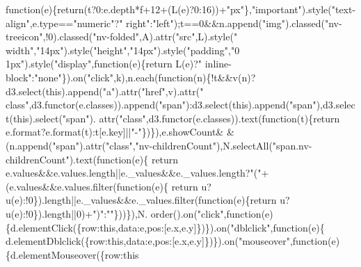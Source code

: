 \begin{DoxyCode}
{{{      function}(e)\{\textcolor{keywordflow}{return}(t?0:e.depth*f+12+(L(e)?0:16))+\textcolor{stringliteral}{"px"}\},\textcolor{stringliteral}{"important"}).style(\textcolor{stringliteral}{"text-align"},e.type==\textcolor{stringliteral}{"numeric"}?\textcolor{stringliteral}{"
      right"}:\textcolor{stringliteral}{"left"});t==0&&n.append(\textcolor{stringliteral}{"img"}).classed(\textcolor{stringliteral}{"nv-treeicon"},!0).classed(\textcolor{stringliteral}{"nv-folded"},A).attr(\textcolor{stringliteral}{"src"},L).style(\textcolor{stringliteral}{"
      width"},\textcolor{stringliteral}{"14px"}).style(\textcolor{stringliteral}{"height"},\textcolor{stringliteral}{"14px"}).style(\textcolor{stringliteral}{"padding"},\textcolor{stringliteral}{"0 1px"}).style(\textcolor{stringliteral}{"display"},\textcolor{keyword}{function}(e)\{\textcolor{keywordflow}{return} L(e)?\textcolor{stringliteral}{"
      inline-block"}:\textcolor{stringliteral}{"none"}\}).on(\textcolor{stringliteral}{"click"},k),n.each(\textcolor{keyword}{function}(n)\{!t&&v(n)?d3.select(\textcolor{keyword}{this}).append(\textcolor{stringliteral}{"a"}).attr(\textcolor{stringliteral}{"href"},v).attr(\textcolor{stringliteral}{"
      class"},d3.functor(e.classes)).append(\textcolor{stringliteral}{"span"}):d3.select(\textcolor{keyword}{this}).append(\textcolor{stringliteral}{"span"}),d3.select(\textcolor{keyword}{this}).select(\textcolor{stringliteral}{"span"}).
      attr(\textcolor{stringliteral}{"class"},d3.functor(e.classes)).text(\textcolor{keyword}{function}(t)\{\textcolor{keywordflow}{return} e.format?e.format(t):t[e.key]||\textcolor{stringliteral}{"-"}\})\}),e.showCount&
      &(n.append(\textcolor{stringliteral}{"span"}).attr(\textcolor{stringliteral}{"class"},\textcolor{stringliteral}{"nv-childrenCount"}),N.selectAll(\textcolor{stringliteral}{"span.nv-childrenCount"}).text(\textcolor{keyword}{function}(e)\{\textcolor{keywordflow}{
      return} e.values&&e.values.length||e.\_values&&e.\_values.length?\textcolor{stringliteral}{"("}+(e.values&&e.values.filter(\textcolor{keyword}{function}(e)\{\textcolor{keywordflow}{
      return} u?u(e):!0\}).length||e.\_values&&e.\_values.filter(function(e)\{\textcolor{keywordflow}{return} u?u(e):!0\}).length||0)+\textcolor{stringliteral}{")"}:\textcolor{stringliteral}{""}\}))\}),N.
      order().on(\textcolor{stringliteral}{"click"},function(e)\{d.elementClick(\{row:\textcolor{keyword}{this},data:e,pos:[e.x,e.y]\})\}).on(\textcolor{stringliteral}{"dblclick"},\textcolor{keyword}{function}(e)\{
      d.elementDblclick(\{row:\textcolor{keyword}{this},data:e,pos:[e.x,e.y]\})\}).on(\textcolor{stringliteral}{"mouseover"},\textcolor{keyword}{function}(e)\{d.elementMouseover(\{row:\textcolor{keyword}{this}
}}
\end{DoxyCode}

